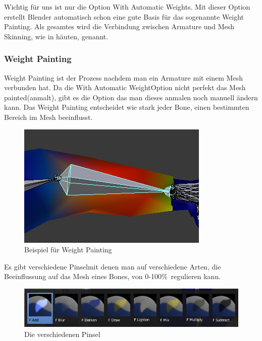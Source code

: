 Wichtig für uns ist nur die Option \dq With Automatic Weights\dq. Mit dieser Option erstellt Blender automatisch schon eine gute Basis für das sogenannte \dq Weight Painting\dq.
Als gesamtes wird die Verbindung zwischen Armature und Mesh \dq Skinning\dq, wie in häuten, genannt.

\subsubsection{Weight Painting}
Weight Painting ist der Prozess nachdem man ein Armature mit einem Mesh verbunden hat. Da die \dq With Automatic Weight\dq Option nicht perfekt das Mesh \dq painted\dq (anmalt),
gibt es die Option das man dieses anmalen noch manuell ändern kann. Das Weight Painting entscheidet wie stark jeder Bone, einen bestimmten Bereich im Mesh beeinflusst.

\begin{figure}[H]
    \centering

    \includegraphics[width=.8\textwidth]{images/rigging_weight_painting_example.PNG}
    \caption{Beispiel für Weight Painting}
\end{figure}

Es gibt verschiedene \dq Pinsel\dq mit denen man auf verschiedene Arten, die Beeinflussung auf das Mesh eines Bones, von 0-100\%\ regulieren kann.

\begin{figure}[H]
    \centering

    \includegraphics[width=.8\textwidth]{images/rigging_weight_painting_tools.PNG}
    \caption{Die verschiedenen Pinsel}
\end{figure}

